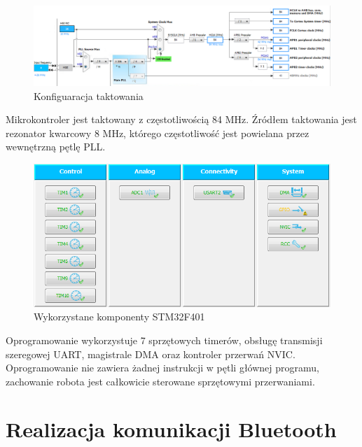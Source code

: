 \documentclass[eng,printmode]{mgr}
\begin{document}
   \begin{figure}[ht]
    \centering
    \includegraphics[width=1\textwidth]{images/clock}
    \caption{Konfiguaracja taktowania}
    \label{fig:clock}
   \end{figure}

Mikrokontroler jest taktowany z częstotliwością 84 MHz. Źródłem taktowania jest rezonator kwarcowy 8 MHz, którego częstotliwość jest powielana  przez wewnętrzną pętlę PLL. 

   \begin{figure}[ht]
    \centering
    \includegraphics[width=1\textwidth]{images/uC_config}
    \caption{Wykorzystane komponenty STM32F401}
    \label{fig:uC_config}
   \end{figure}

Oprogramowanie wykorzystuje 7 sprzętowych timerów, obsługę transmisji szeregowej UART, magistrale DMA oraz kontroler przerwań NVIC. Oprogramowanie nie zawiera żadnej instrukcji w pętli głównej programu, zachowanie robota jest całkowicie sterowane sprzętowymi przerwaniami. 

 \section{Realizacja komunikacji Bluetooth}
\end{document}
